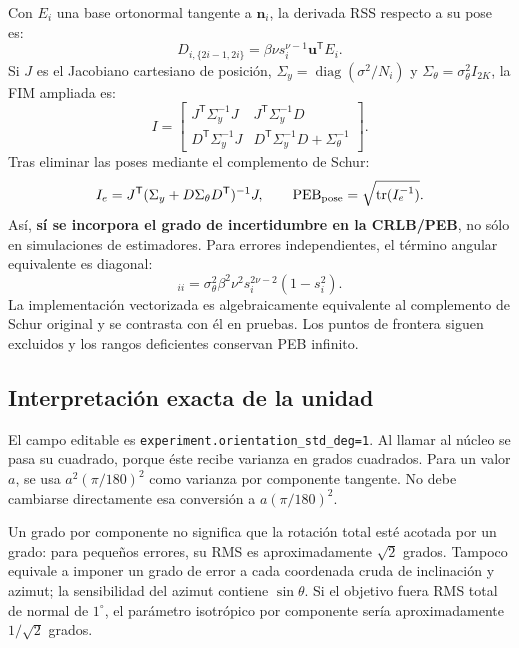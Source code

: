 \documentclass[11pt,a4paper]{article}
\begin{document}
Con $E_i$ una base ortonormal tangente a $\mathbf n_i$, la derivada RSS respecto a su pose es:
\begin{equation}
 D_{i,\{2i-1,2i\}}=\beta\nu s_i^{\nu-1}\mathbf u^{\mathsf T}E_i.
\end{equation}
Si $J$ es el Jacobiano cartesiano de posición, $\Sigma_y=\operatorname{diag}(\sigma^2/N_i)$ y $\Sigma_\theta=\sigma_\theta^2 I_{2K}$, la FIM ampliada es:
\begin{equation}
 I=\begin{bmatrix}
 J^{\mathsf T}\Sigma_y^{-1}J&J^{\mathsf T}\Sigma_y^{-1}D\\
 D^{\mathsf T}\Sigma_y^{-1}J&D^{\mathsf T}\Sigma_y^{-1}D+\Sigma_\theta^{-1}
 \end{bmatrix}.
\end{equation}
Tras eliminar las poses mediante el complemento de Schur:
\begin{equation}
 I_e=J^{\mathsf T}(\Sigma_y+D\Sigma_\theta D^{\mathsf T})^{-1}J,\qquad
 \mathrm{PEB}_{\rm pose}=\sqrt{\operatorname{tr}(I_e^{-1})}.
\label{eq:efim}
\end{equation}
Así, \textbf{sí se incorpora el grado de incertidumbre en la CRLB/PEB}, no sólo en simulaciones de estimadores. Para errores independientes, el término angular equivalente es diagonal:
\begin{equation}
 [D\Sigma_\theta D^{\mathsf T}]_{ii}=\sigma_\theta^2\beta^2\nu^2s_i^{2\nu-2}(1-s_i^2).
\end{equation}
La implementación vectorizada es algebraicamente equivalente al complemento de Schur original y se contrasta con él en pruebas. Los puntos de frontera siguen excluidos y los rangos deficientes conservan PEB infinito.

\subsection{Interpretación exacta de la unidad}
El campo editable es \texttt{experiment.orientation\_std\_deg=1}. Al llamar al núcleo se pasa su cuadrado, porque éste recibe varianza en grados cuadrados. Para un valor $a$, se usa $a^2(\pi/180)^2$ como varianza por componente tangente. No debe cambiarse directamente esa conversión a $a(\pi/180)^2$.

Un grado por componente no significa que la rotación total esté acotada por un grado: para pequeños errores, su RMS es aproximadamente $\sqrt2$ grados. Tampoco equivale a imponer un grado de error a cada coordenada cruda de inclinación y azimut; la sensibilidad del azimut contiene $\sin\theta$. Si el objetivo fuera RMS total de normal de $1^\circ$, el parámetro isotrópico por componente sería aproximadamente $1/\sqrt2$ grados.
\end{document}
